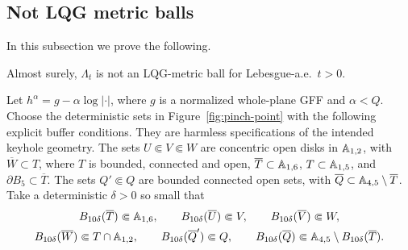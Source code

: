 \documentclass[12pt]{amsart}
\numberwithin{equation}{section}
\newcommand{\regcluster}[2]{\hyperref[eq:regular-cluster]{\Lambda^{#1}_{#2}}}
\begin{document}
	
	
	
	
	\subsection{Not LQG metric balls} \label{subsec:not-lqg-metric-ball}	
	
	
	
	In this subsection we prove the following. 
	
	\begin{prop} \label{prop:not-metric-balls}
		Almost surely, ${\regcluster{}{t}}$ is not an LQG-metric ball for Lebesgue-a.e.\ $t > 0$. 
	\end{prop}
	
	
	
	
Let $h^\alpha=g-\alpha\log|\cdot|$, where $g$ is a normalized whole-plane GFF and $\alpha<Q$.
Choose the deterministic sets in Figure~\ref{fig:pinch-point} with the following
explicit buffer conditions. They are harmless specifications of
the intended keyhole geometry. The sets $U\Subset V\Subset W$
are concentric open disks in $\mathbb{A}_{1,2}$, with
$\overline W\subset T$, where $T$ is bounded, connected and open,
$\overline T\subset\mathbb{A}_{1,6}$, $T\subset\mathbb{A}_{1,5}$, and
$\partial B_5\subset\overline T$. The sets
$Q'\Subset Q$ are bounded connected open sets, with
$\overline Q\subset\mathbb{A}_{4,5}\setminus\overline T$.
Take a deterministic $\delta>0$ so small that
\begin{equation}\label{eq:buffers}
\begin{gathered}
 B_{10\delta}(\overline T)\Subset\mathbb{A}_{1,6},\qquad
 B_{10\delta}(\overline U)\Subset V,\qquad
 B_{10\delta}(\overline V)\Subset W,\\
 B_{10\delta}(\overline W)\Subset T\cap\mathbb{A}_{1,2},\qquad
 B_{10\delta}(\overline Q')\Subset Q,\qquad
 B_{10\delta}(\overline Q)\Subset
       \mathbb{A}_{4,5}\setminus B_{10\delta}(\overline T).
\end{gathered}
\end{equation}
\end{document}
